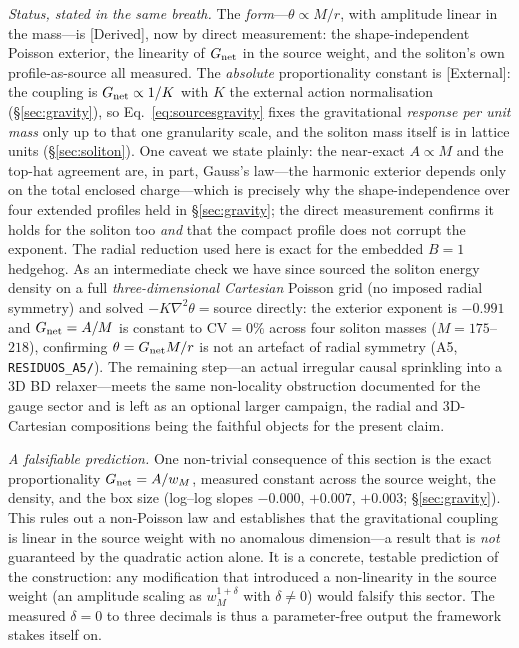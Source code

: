 \documentclass[aps,prd,reprint,nofootinbib,superscriptaddress,floatfix]{revtex4-2}
\theoremstyle{plain}
\newcommand{\Sderiv}{\textsf{[Derived]}}
\newcommand{\Sext}{\textsf{[External]}}
\begin{document}
\emph{Status, stated in the same breath.} The \emph{form}---$\theta\propto M/r$, with
amplitude linear in the mass---is \Sderiv{}, now by direct measurement: the
shape-independent Poisson exterior, the linearity of $G_{\rm net}$ in the source weight,
and the soliton's own profile-as-source all measured. The \emph{absolute}
proportionality constant is \Sext{}: the coupling is $G_{\rm net}\propto1/K$ with $K$
the external action normalisation (\S\ref{sec:gravity}), so
Eq.~\eqref{eq:sourcesgravity} fixes the gravitational \emph{response per unit mass} only
up to that one granularity scale, and the soliton mass itself is in lattice units
(\S\ref{sec:soliton}). One caveat we state plainly: the near-exact $A\propto M$ and the
top-hat agreement are, in part, Gauss's law---the harmonic exterior depends only on the
total enclosed charge---which is precisely why the shape-independence over four extended
profiles held in \S\ref{sec:gravity}; the direct measurement confirms it holds for the
soliton too \emph{and} that the compact profile does not corrupt the exponent. The
radial reduction used here is exact for the embedded $B=1$ hedgehog. As an intermediate
check we have since sourced the soliton energy density on a full \emph{three-dimensional
Cartesian} Poisson grid (no imposed radial symmetry) and solved $-K\nabla^2\theta={}$source
directly: the exterior exponent is $-0.991$ and $G_{\rm net}=A/M$ is constant to
$\mathrm{CV}=0\%$ across four soliton masses ($M=175$--$218$), confirming
$\theta=G_{\rm net}M/r$ is not an artefact of radial symmetry (A5,
\texttt{RESIDUOS\_A5/}). The remaining step---an actual irregular causal sprinkling into
a $3$D BD relaxer---meets the same non-locality obstruction documented for the gauge
sector and is left as an optional larger campaign, the radial and $3$D-Cartesian
compositions being the faithful objects for the present claim.

\emph{A falsifiable prediction.} One non-trivial consequence of this section is the
exact proportionality $G_{\rm net}=A/w_M$, measured constant across the source weight,
the density, and the box size (log--log slopes $-0.000$, $+0.007$, $+0.003$;
\S\ref{sec:gravity}). This rules out a non-Poisson law and establishes that the
gravitational coupling is linear in the source weight with no anomalous dimension---a
result that is \emph{not} guaranteed by the quadratic action alone. It is a concrete,
testable prediction of the construction: any modification that introduced a
non-linearity in the source weight (an amplitude scaling as $w_M^{1+\delta}$ with
$\delta\neq0$) would falsify this sector. The measured $\delta=0$ to three decimals is
thus a parameter-free output the framework stakes itself on.
\end{document}
